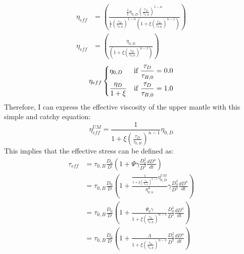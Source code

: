 \documentclass{article}
\begin{document}
\begin{align}
    \eta_{eff} &= \left( \frac{\frac{1}{\xi}\eta_{0,D}\left(\frac{\tau_D}{\tau_{0,B}}\right)^{1-n}}{\frac{1}{\xi}\left(\frac{\tau_D}{\tau_{0,B}}\right)^{1-n}\left(1+ \xi\left( \frac{\tau_D}{\tau_{0,B}}\right)^{n-1}\right)}\right)\\
    \eta_{eff} &= \left( \frac{\eta_{0,D}}{\left(1+ \xi\left( \frac{\tau_D}{\tau_{0,B}}\right)^{n-1}\right)}\right)
\end{align}
\begin{equation}
 \eta_{eff}
\begin{dcases}
    \eta_{0,D} & \text{if } \frac{\tau_D}{\tau_{B,0}}=0.0\\
   \frac{\eta_{D}}{1+\xi}& \text{if } \frac{\tau_D}{\tau_{B,0}}=1.0
\end{dcases}
\end{equation}
Therefore, I can express the effective viscosity of the upper mantle with this simple and catchy equation:
\begin{equation}
    \eta^{UM}_{eff}=\frac{1}{1+\xi\left(\frac{\tau_D}{\tau_{0,B}}\right)^{n-1}}\eta_{0,D}
\end{equation}
This implies that the effective stress can be defined as: 
\begin{align}
    \tau_{eff} &=\tau_{0,B} \frac{D_0}{D}\left(1+\Psi\gamma\frac{D_0^2}{D^2} \frac{dD^{a}}{dt}\right)\\
        &= \tau_{0,B} \frac{D_0}{D}\left(1+\frac{\frac{1}{1+\xi\left(\frac{\tau_D}{\tau_{0,B}}\right)^{n-1}}\eta^{UM}_{0,D}}{\eta^S_{0,n}}\gamma\frac{D_0^2}{D^2} \frac{dD^{a}}{dt}\right)\\
        &= \tau_{0,B} \frac{D_0}{D}\left(1+\frac{\Psi_0\gamma}{1+\xi\left(\frac{\tau_D}{\tau_{0,B}}\right)^{n-1}}\frac{D_0^2}{D^2} \frac{dD^{a}}{dt}\right)\\
        &= \tau_{0,B} \frac{D_0}{D}\left(1+\frac{\Lambda}{1+\xi\left(\frac{\tau_D}{\tau_{0,B}}\right)^{n-1}}\frac{D_0^2}{D^2} \frac{dD^{a}}{dt}\right)
\end{align}
\end{document}

